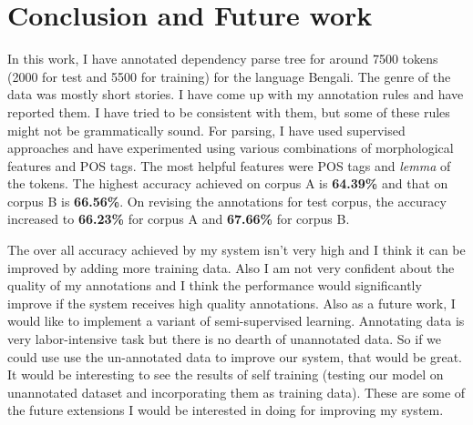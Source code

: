 \documentclass[11pt,letterpaper]{article}
\begin{document}
\section{Conclusion and Future work}

In this work, I have annotated dependency parse tree for around 7500 tokens (2000 for test and 5500 for training) for the language Bengali. The genre of the data was mostly short stories. I have come up with my annotation rules and have reported them. I have tried to be consistent with them, but some of these rules might not be grammatically sound. For parsing, I have used supervised approaches and have experimented using various combinations of morphological features and POS tags. The most helpful features were POS tags and \textit{lemma} of the tokens. The highest accuracy achieved on corpus A is \textbf{64.39\%} and that on corpus B is \textbf{66.56\%}. On revising the annotations for test corpus, the accuracy increased to \textbf{66.23\%} for corpus A and \textbf{67.66\%} for corpus B. 

The over all accuracy achieved by my system isn't very high and I think it can be improved by adding more training data. Also I am not very confident about the quality of my annotations and I think the performance would significantly improve if the system receives high quality annotations. Also as a future work, I would like to implement a variant of semi-supervised learning. Annotating data is very labor-intensive task but there is no dearth of unannotated data. So if we could use use the un-annotated data to improve our system, that would be great. It would be interesting to see the results of self training (testing our model on unannotated dataset and incorporating them as training data). These are some of the future extensions I would be interested in doing for improving my system.






 

\newpage




\label{lastpage}
\end{document}
